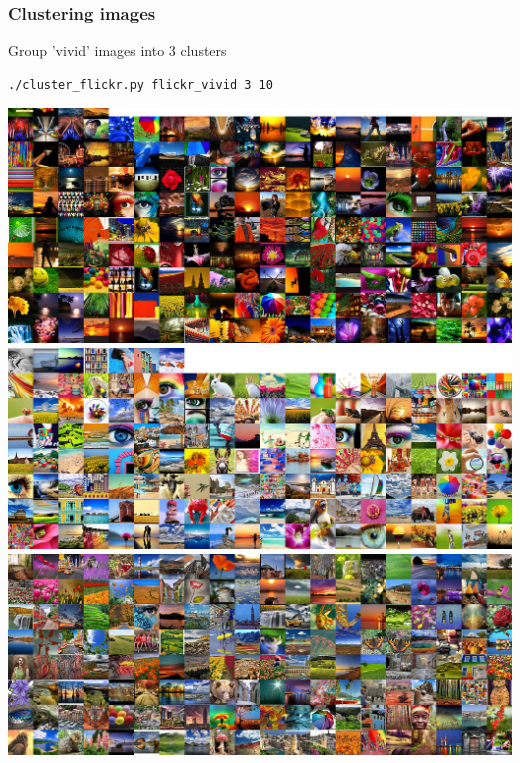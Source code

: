 \begin{frame}[fragile]
  \frametitle{Clustering images}

  \begin{center}

    \begin{block}{Group 'vivid' images into 3 clusters}
        \begin{lstlisting}[language=bash]
 ./cluster_flickr.py flickr_vivid 3 10
        \end{lstlisting}
    \end{block}
    \vskip20pt
    \includegraphics[height=0.2\textheight]{../../code/image_data/flickr_vivid_cluster_0.png}
    \includegraphics[height=0.2\textheight]{../../code/image_data/flickr_vivid_cluster_1.png}
    \includegraphics[height=0.2\textheight]{../../code/image_data/flickr_vivid_cluster_2.png}

  \end{center}

\end{frame}
